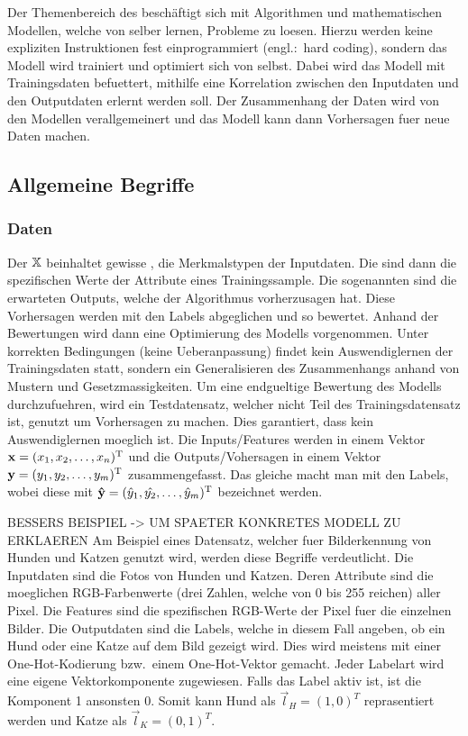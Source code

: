 \documentclass[../main]{subfiles}
\begin{document}
Der Themenbereich des  beschäftigt sich mit Algorithmen und mathematischen Modellen, welche von selber lernen, Probleme zu loesen.
Hierzu werden keine expliziten Instruktionen fest einprogrammiert (engl.:\ hard coding), sondern das Modell wird trainiert und optimiert sich von selbst.
Dabei wird das Modell mit Trainingsdaten befuettert, mithilfe eine Korrelation zwischen den Inputdaten und den Outputdaten erlernt werden soll.
Der Zusammenhang der Daten wird von den Modellen verallgemeinert und das Modell kann dann Vorhersagen fuer neue Daten machen.

\subsection{Allgemeine Begriffe}

\subsubsection{Daten}

Der  $\mathbb{X}$ beinhaltet gewisse , die Merkmalstypen der Inputdaten.
Die  sind dann die spezifischen Werte der Attribute eines Trainingssample.
Die sogenannten  sind die erwarteten Outputs, welche der Algorithmus vorherzusagen hat.
Diese Vorhersagen werden mit den Labels abgeglichen und so bewertet.
Anhand der Bewertungen wird dann eine Optimierung des Modells vorgenommen.
Unter korrekten Bedingungen (keine Ueberanpassung) findet kein Auswendiglernen der Trainingsdaten statt,
sondern ein Generalisieren des Zusammenhangs anhand von Mustern und Gesetzmassigkeiten.
\para{}
Um eine endgueltige Bewertung des Modells durchzufuehren, wird ein Testdatensatz, welcher nicht Teil des Trainingsdatensatz ist, genutzt um Vorhersagen zu machen.
Dies garantiert, dass kein Auswendiglernen moeglich ist.
\para{}
Die Inputs/Features werden in einem Vektor $\mathbf{x}=(x_1,x_2,\ldots,x_n)^\mathrm{T}$ und die Outputs/Vohersagen in einem Vektor $\mathbf{y}=(y_1,y_2,\ldots,y_m)^\mathrm{T}$ zusammengefasst.
Das gleiche macht man mit den Labels, wobei diese mit $\mathbf{\hat{y}}=(\hat{y}_1,\hat{y_2},\ldots,\hat{y}_m)^\mathrm{T}$ bezeichnet werden.
\par \medskip
BESSERS BEISPIEL -> UM SPAETER KONKRETES MODELL ZU ERKLAEREN
Am Beispiel eines Datensatz, welcher fuer Bilderkennung von Hunden und Katzen genutzt wird, werden diese Begriffe verdeutlicht.
Die Inputdaten sind die Fotos von Hunden und Katzen. Deren Attribute sind die moeglichen RGB-Farbenwerte (drei Zahlen, welche von 0 bis 255 reichen) aller Pixel.
Die Features sind die spezifischen RGB-Werte der Pixel fuer die einzelnen Bilder. Die Outputdaten sind die Labels, welche in diesem Fall angeben, ob ein Hund oder eine Katze auf dem Bild gezeigt wird.
Dies wird meistens mit einer One-Hot-Kodierung bzw.\ einem One-Hot-Vektor
gemacht. Jeder Labelart wird eine eigene Vektorkomponente zugewiesen. Falls das
Label aktiv ist, ist die Komponent 1 ansonsten 0. Somit kann Hund als $\vec{l}_H={(1,0)}^T$ reprasentiert werden und Katze als $\vec{l}_K={(0,1)}^T$.
\end{document}
